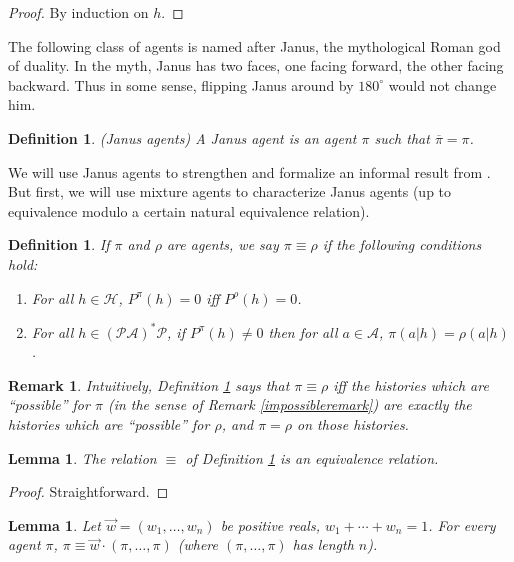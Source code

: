 \documentclass[twoside]{article}
\newtheorem{definition}[theorem]{Definition}
\newtheorem{remark}[theorem]{Remark}
\newtheorem{lemma}[theorem]{Lemma}
\begin{document}
\begin{proof}
    By induction on $h$.
\end{proof}

The following class of agents is named after Janus, the mythological
Roman god of duality. In the myth, Janus has two faces, one facing
forward, the other facing backward. Thus in some sense, flipping Janus
around by $180^\circ$ would not change him.

\begin{definition}
    (Janus agents)
    A \emph{Janus agent} is an agent $\pi$ such that
    $\overline{\pi}=\pi$.
\end{definition}

We will use Janus agents to strengthen and formalize an informal result
from \cite{alexander2021reward}.
But first, we will use mixture agents to characterize
Janus agents (up to equivalence modulo a certain natural equivalence relation).

\begin{definition}
\label{equivdefn}
    If $\pi$ and $\rho$ are agents, we say $\pi\equiv\rho$ if the
    following conditions hold:
    \begin{enumerate}
        \item For all $h\in\mathcal H$, $P^\pi(h)=0$ iff $P^\rho(h)=0$.
        \item For all $h\in(\mathcal P\mathcal A)^*\mathcal P$,
            if $P^\pi(h)\not=0$ then for all $a\in\mathcal A$,
            $\pi(a|h)=\rho(a|h)$.
    \end{enumerate}
\end{definition}

\begin{remark}
    Intuitively, Definition \ref{equivdefn} says that $\pi\equiv\rho$
    iff the histories which are ``possible'' for $\pi$ (in the sense of
    Remark \ref{impossibleremark}) are exactly the histories which are
    ``possible'' for $\rho$, and $\pi=\rho$ on those histories.
\end{remark}

\begin{lemma}
\label{equivrelationlemma}
    The relation $\equiv$ of Definition \ref{equivdefn} is an equivalence
    relation.
\end{lemma}

\begin{proof}
    Straightforward.
\end{proof}

\begin{lemma}
\label{piopluspilemma}
    Let $\vec w=(w_1,\ldots,w_n)$ be positive reals,
    $w_1+\cdots+w_n=1$. For every agent $\pi$,
    $\pi\equiv\vec w\cdot (\pi,\ldots,\pi)$ (where
    $(\pi,\ldots,\pi)$ has length $n$).
\end{lemma}
\end{document}
